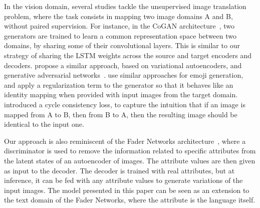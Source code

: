 In the vision domain, several studies tackle the unsupervised image translation problem, where the task consists in mapping two image domains A and B, without paired supervision. For instance, in the CoGAN architecture~\citep{liu2016coupled}, two generators are trained to learn a common representation space between two domains, by sharing some of their convolutional layers. This is similar to our strategy of sharing the LSTM weights across the source and target encoders and decoders. \citet{liu2017unsupervised} propose a similar approach, based on variational autoencoders, and generative adversarial networks~\citep{goodfellow2014generative}. \citet{taigman2016unsupervised} use similar approaches for emoji generation, and apply a regularization term to the generator so that it behaves like an identity mapping when provided with input images from the target domain. \citet{zhu2017unpaired} introduced a cycle consistency loss, to capture the intuition that if an image is mapped from A to B, then from B to A, then the resulting image should be identical to the input one.

Our approach is also reminiscent of the Fader Networks architecture~\citep{lample2017fader}, where a discriminator is used to remove the information related to specific attributes from the latent states of an autoencoder of images. The attribute values are then given as input to the decoder. The decoder is trained with real attributes, but at inference, it can be fed with any attribute values to generate variations of the input images. The model presented in this paper can be seen as an extension to the text domain of the Fader Networks, where the attribute is the language itself.
